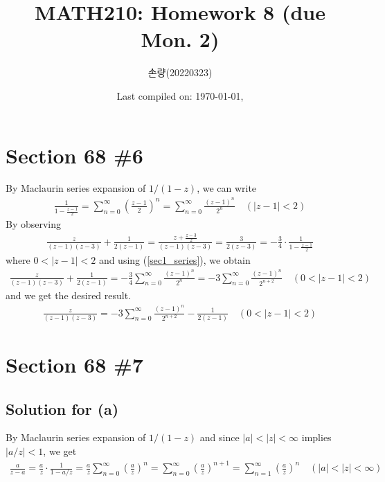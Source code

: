 \documentclass{scrartcl}
\title{MATH210: Homework 8 (due Mon. 2)}
\author{손량(20220323)}
\date{Last compiled on: \today, \currenttime}
\begin{document}
\maketitle

\section{Section 68 \#6}
By Maclaurin series expansion of \(1 / (1 - z)\), we can write
\begin{align}\label{sec1_series}
  \frac{1}{1 - \frac{z - 1}{2}}
  = \sum^\infty_{n = 0} \left( \frac{z - 1}{2} \right)^n
  = \sum^\infty_{n = 0} \frac{(z - 1)^n}{2^n} \quad (|z - 1| < 2)
\end{align}
By observing
\begin{align*}
  \frac{z}{(z - 1)(z - 3)} + \frac{1}{2(z - 1)} = \frac{z + \frac{z - 3}{2}}{(z - 1)(z - 3)} = \frac{3}{2(z - 3)} = -\frac{3}{4} \cdot \frac{1}{1 - \frac{z - 1}{2}}
\end{align*}
where \(0 < |z - 1| < 2\) and using (\ref{sec1_series}), we obtain
\begin{align*}
  \frac{z}{(z - 1)(z - 3)} + \frac{1}{2(z - 1)}
  = -\frac{3}{4} \sum^\infty_{n = 0} \frac{(z - 1)^n}{2^n}
  = -3 \sum^\infty_{n = 0} \frac{(z - 1)^n}{2^{n + 2}} \quad (0 < |z - 1| < 2)
\end{align*}
and we get the desired result.
\begin{align*}
  \frac{z}{(z - 1)(z - 3)}
  = -3 \sum^\infty_{n = 0} \frac{(z - 1)^n}{2^{n + 2}} - \frac{1}{2(z - 1)} \quad (0 < |z - 1| < 2)
\end{align*}

\section{Section 68 \#7}
\subsection{Solution for (a)}
By Maclaurin series expansion of \(1 / (1 - z)\) and since \(|a| < |z| < \infty\) implies \(|a / z| < 1\), we get
\begin{align*}
  \frac{a}{z - a}
  = \frac{a}{z} \cdot \frac{1}{1 - a / z}
  = \frac{a}{z} \sum^\infty_{n = 0} \left( \frac{a}{z} \right)^n
  = \sum^\infty_{n = 0} \left( \frac{a}{z} \right)^{n + 1}
  = \sum^\infty_{n = 1} \left( \frac{a}{z} \right)^n \quad (|a| < |z| < \infty)
\end{align*}
\end{document}
